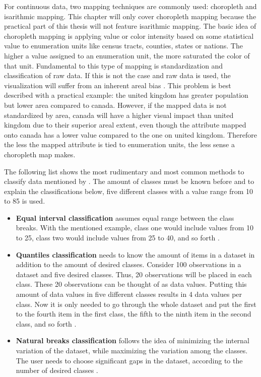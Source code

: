 For continuous data, two mapping techniques are commonly used: choropleth and isarithmic mapping. This chapter will only cover choropleth mapping because the practical part of this thesis will not feature isarithmic mapping. The basic idea of choropleth mapping is applying value or color intensity based on some statistical value to enumeration units like census tracts, counties, states or nations. The higher a value assigned to an enumeration unit, the more saturated the color of that unit. Fundamental to this type of mapping is standardization and classification of raw data. If this is not the case and raw data is used, the visualization will suffer from an inherent areal bias . This problem is best described with a practical example: the united kingdom has greater population but lower area compared to canada. However, if the mapped data is not standardized by area, canada will have a higher visual impact than united kingdom due to their superior areal extent, even though the attribute mapped onto canada has a lower value compared to the one on united kingdom. Therefore the less the mapped attribute is tied to enumeration units, the less sense a choropleth map makes.

The following list shows the most rudimentary and most common methods to classify data mentioned by \citeauthor{McMaster2010}. The amount of classes must be known before and to explain the classifications below, five different classes with a value range from 10 to 85 is used.

\begin{itemize}

\item \textbf{Equal interval classification} assumes equal range between the class breaks. With the mentioned example, class one would include values from 10 to 25, class two would include values from 25 to 40, and so forth .

\item \textbf{Quantiles classification} needs to know the amount of items in a dataset in addition to the amount of desired classes. Consider 100 observations in a dataset and five desired classes. Thus, 20 observations will be placed in each class. These 20 observations can be thought of as data values. Putting this amount of data values in five different classes results in 4 data values per class. Now it is only needed to go through the whole dataset and put the first to the fourth item in the first class, the fifth to the ninth item in the second class, and so forth .

\item \textbf{Natural breaks classification} follows the idea of minimizing the internal variation of the dataset, while maximizing the variation among the classes. The user needs to choose significant gaps in the dataset, according to the number of desired classes .

\end{itemize}

